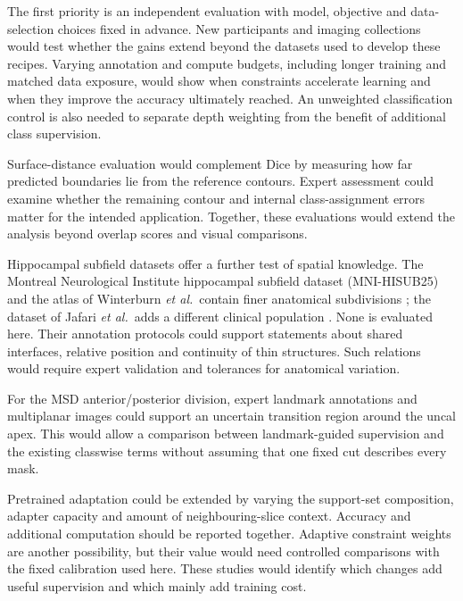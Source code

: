 \documentclass[12pt,a4paper]{article}
\begin{document}
The first priority is an independent evaluation with model,
objective and data-selection choices fixed in advance. New participants
and imaging collections would test whether the gains extend beyond the
datasets used to develop these recipes. Varying annotation and compute
budgets, including longer training and matched data exposure, would
show when constraints accelerate learning and when they improve the
accuracy ultimately reached. An unweighted classification control is
also needed to separate depth weighting from the benefit of additional
class supervision.

Surface-distance evaluation would complement Dice by measuring how far
predicted boundaries lie from the reference contours. Expert assessment
could examine whether the remaining contour and internal class-assignment
errors matter for the intended application. Together, these evaluations
would extend the analysis beyond overlap scores and visual comparisons.

Hippocampal subfield datasets offer a further test of spatial knowledge.
The Montreal Neurological Institute hippocampal subfield dataset
(MNI-HISUB25) and the atlas of Winterburn \emph{et al.}\ contain finer
anatomical subdivisions
\cite{kulaga2015subfields,winterburn2013atlas}; the dataset of
Jafari \emph{et al.}\ adds a different clinical population
\cite{jafari2011dataset}. None is evaluated here. Their annotation
protocols could support statements about shared interfaces, relative
position and continuity of thin structures. Such relations would
require expert validation and tolerances for anatomical variation.

For the MSD anterior/posterior division, expert landmark annotations
and multiplanar images could support an uncertain transition region
around the uncal apex. This would allow a comparison between
landmark-guided supervision and the existing classwise terms without
assuming that one fixed cut describes every mask.

Pretrained adaptation could be extended by varying the support-set
composition, adapter capacity and amount of neighbouring-slice context.
Accuracy and additional computation should be reported together.
Adaptive constraint weights are another possibility, but their value
would need controlled comparisons with the fixed calibration used here.
These studies would identify which changes add useful supervision and
which mainly add training cost.

\clearpage
\end{document}
